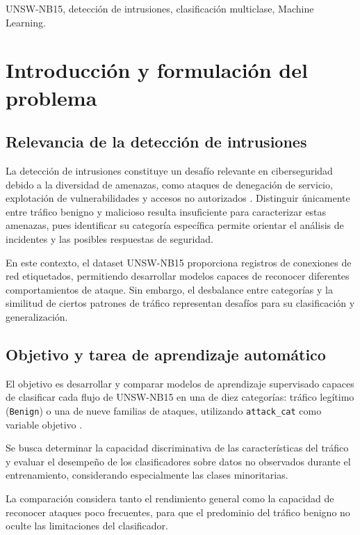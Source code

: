 \documentclass[conference]{IEEEtran}
\begin{document}
\begin{IEEEkeywords}
UNSW-NB15, detección de intrusiones, clasificación multiclase, Machine Learning.
\end{IEEEkeywords}

\section{Introducción y formulación del problema}

\subsection{Relevancia de la detección de intrusiones}

La detección de intrusiones constituye un desafío relevante en ciberseguridad debido a la diversidad de amenazas, como ataques de denegación de servicio, explotación de vulnerabilidades y accesos no autorizados \cite{enisa2025}. Distinguir únicamente entre tráfico benigno y malicioso resulta insuficiente para caracterizar estas amenazas, pues identificar su categoría específica permite orientar el análisis de incidentes y las posibles respuestas de seguridad.

En este contexto, el dataset UNSW-NB15 proporciona registros de conexiones de red etiquetados, permitiendo desarrollar modelos capaces de reconocer diferentes comportamientos de ataque. Sin embargo, el desbalance entre categorías y la similitud de ciertos patrones de tráfico representan desafíos para su clasificación y generalización.

\subsection{Objetivo y tarea de aprendizaje automático}

El objetivo es desarrollar y comparar modelos de aprendizaje supervisado capaces de clasificar cada flujo de UNSW-NB15 en una de diez categorías: tráfico legítimo (\texttt{Benign}) o una de nueve familias de ataques, utilizando \texttt{attack\_cat} como variable objetivo \cite{moustafa2015unsw,moustafa2016evaluation}.

Se busca determinar la capacidad discriminativa de las características del tráfico y evaluar el desempeño de los clasificadores sobre datos no observados durante el entrenamiento, considerando especialmente las clases minoritarias.

La comparación considera tanto el rendimiento general como la capacidad de reconocer ataques poco frecuentes, para que el predominio del tráfico benigno no oculte las limitaciones del clasificador.
\end{document}
